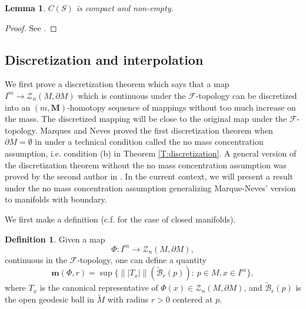 \documentclass[10pt]{amsart}
\newtheorem{lemma}[theorem]{Lemma}
\theoremstyle{definition}
\newtheorem{definition}[theorem]{Definition}
\theoremstyle{remark}
\numberwithin{equation}{section}
\newcommand{\F}{\mathcal{F}}
\newcommand{\Z}{\mathcal{Z}}
\newcommand{\m}{\mathbf{m}}
\newcommand{\M}{\mathbf{M}}
\newcommand{\tM}{\widetilde{M}}
\newcommand{\tBcal}{\widetilde{\mathcal{B}}}
\begin{document}
\begin{lemma}
\label{L:critical-set}
$C(S)$ is compact and non-empty.
\end{lemma}
\begin{proof}
See \cite[4.2]{Pitts}.
\end{proof}




\subsection{Discretization and interpolation}
\label{SS:discret}

We first prove a discretization theorem which says that a map $I^m \to \Z_{n}(M, \partial M)$ which is continuous under the $\F$-topology can be discretized into an $(m, \M)$-homotopy sequence of mappings without too much increase on the mass. The discretized mapping will be close to the original map under the $\F$-topology. Marques and Neves proved the first discretization theorem when $\partial M=\emptyset$ in \cite[Theorem 13.1]{Marques-Neves14}\cite[Theorem 3.9]{Marques-Neves17} under a technical condition called the no mass concentration assumption, i.e. condition (b) in Theorem \ref{T:discretization}. A general version of the discretization theorem without the no mass concentration assumption was proved by the second author in \cite[Theorem 5.1]{Zhou15}. In the current context, we will present a result under the no mass concentration assumption generalizing Marque-Neves' version to manifolds with boundary.

We first make a definition (c.f. \cite[\S 4.2]{Marques-Neves14} for the case of closed manifolds).

\begin{definition}
Given a map
$$\Phi: I^m\rightarrow \Z_{n}(M, \partial M),$$
continuous in the $\F$-topology, one can define a quantity
\begin{equation}
\m(\Phi, r)=\sup\big\{\| |T_x| \| (\tBcal_r(p)):\ p\in M, x\in I^m\big\},
\end{equation}
where $T_x$ is the canonical representative of $\Phi(x) \in \Z_n(M, \partial M)$, and $\tBcal_r(p)$ is the open geodesic ball in $\tM$ with radius $r>0$ centered at $p$.
\end{definition}
\end{document}
